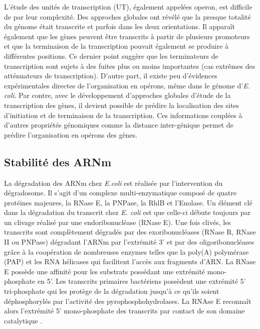 \documentclass[12pt,a4paper]{report}
\begin{document}
\begin{onehalfspace}
L'étude des unités de transcription (UT), également appelées \gls{operon}, est difficile de par leur complexité. Des approches globales ont révélé que la presque totalité du génome était transcrite et parfois dans les deux orientations. Il apparaît également que les gènes peuvent être transcrits à partir de plusieurs promoteurs et que la terminaison de la transcription pouvait également se produire à différentes positions. Ce dernier point suggère que les terminateurs de transcription sont sujets à des fuites plus ou moins importantes (cas extrêmes des atténuateurs de transcription). D'autre part, il existe peu d'évidences expérimentales directes de l'organisation en opérons, même dans le génome d'\textit{E. coli}. Par contre, avec le développement d'approches globales d'étude de la transcription des gènes, il devient possible de prédire la localisation des sites d'initiation et de terminaison de la transcription. Ces informations couplées à d'autres propriétés génomiques comme la distance inter-génique permet de prédire l'organisation en opérons des gènes.

\subsection*{Stabilité des ARNm}

La dégradation des ARNm chez \textit{E.coli} est réalisée par l'intervention du dégradosome. Il s'agit d'un complexe multi-enzymatique composé de quatre protéines majeures, la RNase E, la PNPase, la RhlB et l'Enolase. Un élément clé dans la dégradation du transcrit chez \textit{E. coli} est que celle-ci débute toujours par un clivage réalisé par une endoribonucléase (RNase E). Une fois clivés, les transcrits sont complètement dégradés par des exoribonucléases (RNase R, RNase II ou PNPase) dégradant l'ARNm par l'extrémité 3' et par des oligoribonucléases grâce à la coopération de nombreuses enzymes telles que la poly(A) polymérase (PAP) et les RNA hélicases qui facilitent l'accès aux fragments d'ARN. La RNase E possède une affinité pour les substrats possédant une extrémité mono-phosphate en 5'. Les transcrits primaires bactériens possèdent une extrémité 5' tri-phosphate qui les protège de la dégradation jusqu'à ce qu'ils soient déphosphorylés par l'activité des pyrophosphohydrolases. La RNAse E reconnaît alors l'extrémité 5' mono-phosphate des transcrits par contact de son domaine catalytique \citep{Callaghan2005,Bandyra2013}.


\end{onehalfspace}
\end{document}
